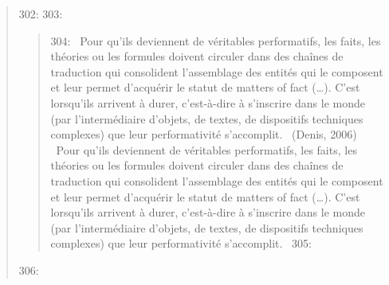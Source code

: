 \begin{quote}
302: 
303: \begin{quote}
304: {\guillemotleft}~Pour qu{\textquoteright}ils deviennent de {\guillemotleft} v\'eritables {\guillemotright} performatifs, les faits, les th\'eories ou les formules doivent circuler dans des cha\^ines de traduction qui consolident l{\textquoteright}assemblage des entit\'es qui le composent et leur permet d{\textquoteright}acqu\'erir le statut de {\guillemotleft} matters of fact {\guillemotright} ({\dots}). C{\textquoteright}est lorsqu{\textquoteright}ils arrivent \`a durer, c{\textquoteright}est-\`a-dire \`a s{\textquoteright}inscrire dans le monde (par l{\textquoteright}interm\'ediaire d{\textquoteright}objets, de textes, de dispositifs techniques complexes) que leur performativit\'e s{\textquoteright}accomplit.~{\guillemotright} (Denis, 2006)
{\guillemotleft}~Pour qu{\textquoteright}ils deviennent de {\guillemotleft} v\'eritables {\guillemotright} performatifs, les faits, les th\'eories ou les formules doivent circuler dans des cha\^ines de traduction qui consolident l{\textquoteright}assemblage des entit\'es qui le composent et leur permet d{\textquoteright}acqu\'erir le statut de {\guillemotleft} matters of fact {\guillemotright} ({\dots}). C{\textquoteright}est lorsqu{\textquoteright}ils arrivent \`a durer, c{\textquoteright}est-\`a-dire \`a s{\textquoteright}inscrire dans le monde (par l{\textquoteright}interm\'ediaire d{\textquoteright}objets, de textes, de dispositifs techniques complexes) que leur performativit\'e s{\textquoteright}accomplit.~{\guillemotright} \cite{Denis2006}
305: \end{quote}
306: 

\end{quote}
